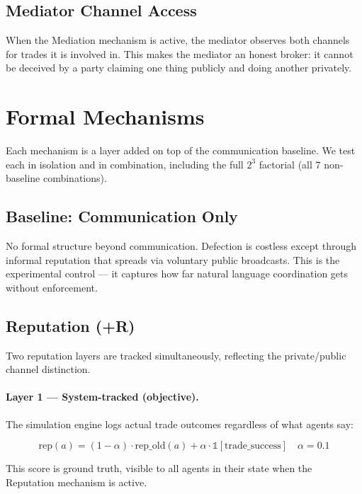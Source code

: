 \documentclass[12pt, a4paper]{article}
\begin{document}
\subsection{Mediator Channel Access}

When the Mediation mechanism is active, the mediator observes both channels for trades it is involved in. This makes the mediator an honest broker: it cannot be deceived by a party claiming one thing publicly and doing another privately.

\section{Formal Mechanisms}
\label{sec:mechanisms}

Each mechanism is a layer added on top of the communication baseline. We test each in isolation and in combination, including the full $2^3$ factorial (all 7 non-baseline combinations).

\subsection{Baseline: Communication Only}

No formal structure beyond communication. Defection is costless except through informal reputation that spreads via voluntary public broadcasts. This is the experimental control — it captures how far natural language coordination gets without enforcement.

\subsection{Reputation (+R)}

Two reputation layers are tracked simultaneously, reflecting the private/public channel distinction.

\paragraph{Layer 1 — System-tracked (objective).}

The simulation engine logs actual trade outcomes regardless of what agents say:

\[
\text{rep}(a) = (1 - \alpha) \cdot \text{rep\_old}(a) + \alpha \cdot \mathbb{1}[\text{trade\_success}] \quad \alpha = 0.1
\]

This score is ground truth, visible to all agents in their state when the Reputation mechanism is active.
\end{document}
